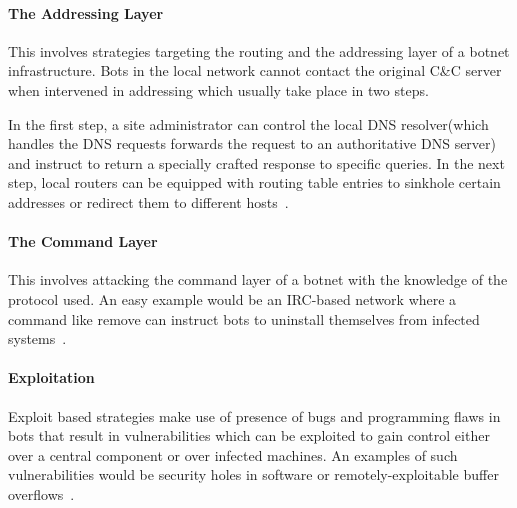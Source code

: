 \paragraph{The Addressing Layer}
This involves strategies targeting the routing and the addressing layer of a botnet infrastructure. Bots in the local network cannot contact the original C&C server when intervened in addressing which usually take place in two steps.

In the first step, a site administrator can control the local DNS resolver(which handles the DNS requests forwards the request to an authoritative DNS server) and instruct to return a specially crafted response to specific queries. In the next step, local routers can be equipped with routing table entries to sinkhole certain addresses or redirect them to different hosts~\cite{leder2009proactive}.


\paragraph{The Command Layer}
This involves attacking the command layer of a botnet with the knowledge of the protocol used. An easy example would be an IRC-based network where a command like remove can instruct bots to uninstall themselves from infected systems~\cite{leder2009proactive}.


\paragraph{Exploitation}
Exploit based strategies make use of presence of bugs and programming flaws in bots that result in vulnerabilities which can be exploited to gain control either over a central component or over infected machines. An examples of such vulnerabilities would be security holes in software or remotely-exploitable buffer overflows~\cite{leder2009proactive}.


